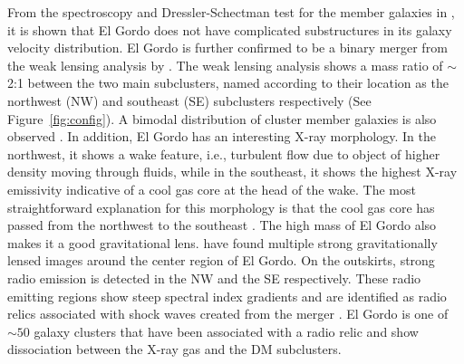 \documentclass[letterpaper,useAMS,usenatbib]{mn2e}
\begin{document}
From the spectroscopy and Dressler-Schectman test for the member galaxies
in \cite{Sifon13}, it is shown that El Gordo does not have complicated
substructures in its galaxy velocity distribution. 
El Gordo is further confirmed to be a binary merger 
from the weak lensing analysis by \cite{Jee13}. The weak lensing analysis shows
a mass ratio of $\sim$2:1  between the two main subclusters, named
according to their location as the northwest (NW) and southeast (SE) subclusters respectively 
(See Figure~\ref{fig:config}). A bimodal distribution of cluster member galaxies is
also observed \citep{M12}. In addition, El Gordo has an interesting X-ray morphology. In the northwest, it shows a wake feature, i.e.,
turbulent flow due to object of higher density moving through fluids, while
in the southeast, it shows the highest X-ray emissivity indicative of a
cool gas core at the head of the wake. The most straightforward explanation for this morphology is that the
cool gas core has passed from the northwest to the southeast
\citep{M12}. 
The high mass of El Gordo also makes it a good
gravitational lens. \cite{Zitrin13} have found multiple strong
gravitationally lensed images around the center region of El Gordo. 
On the outskirts, strong radio emission is detected in
the NW and the SE respectively. These radio emitting regions show steep spectral
index gradients and are identified as radio relics associated with shock waves
created from the merger \citep{L13}. El Gordo is one of $\sim 50$ galaxy clusters that have
been associated with a radio relic and show dissociation between the X-ray
gas and the DM subclusters. \par 
\end{document}
